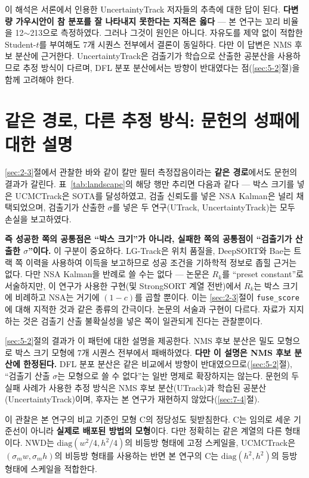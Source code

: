 \documentclass[12pt,a4paper,oneside]{report}
\begin{document}
이 해석은 서론에서 인용한 UncertaintyTrack 저자들의 추측에 대한 답이 된다. \textbf{다변량 가우시안이 참 분포를 잘 나타내지 못한다는 지적은 옳다} --- 본 연구는 꼬리 비율을 12$\sim$213으로 측정하였다. 그러나 그것이 원인은 아니다. 자유도를 제약 없이 적합한 Student-$t$를 부여해도 7개 시퀀스 전부에서 결론이 동일하다. 다만 이 답변은 NMS 후보 분산에 근거한다. UncertaintyTrack은 검출기가 학습으로 산출한 공분산을 사용하므로 추정 방식이 다르며, DFL 분포 분산에서는 방향이 반대였다는 점(\ref{sec:5-2}절)을 함께 고려해야 한다.

\section{같은 경로, 다른 추정 방식: 문헌의 성패에 대한 설명}\label{sec:6-2}

\ref{sec:2-3}절에서 관찰한 바와 같이 칼만 필터 측정잡음이라는 \textbf{같은 경로}에서도 문헌의 결과가 갈린다. 표~\ref{tab:landscape}의 해당 행만 추리면 다음과 같다 --- 박스 크기를 넣은 UCMCTrack\citep{yi2024}은 SOTA를 달성하였고, 검출 신뢰도를 넣은 NSA Kalman\citep{du2023}은 널리 채택되었으며, 검출기가 산출한 $\sigma$를 넣은 두 연구(UTrack\citep{solano2024}, UncertaintyTrack\citep{lee2024})는 모두 손실을 보고하였다.

\textbf{즉 성공한 쪽의 공통점은 ``박스 크기''가 아니라, 실패한 쪽의 공통점이 ``검출기가 산출한 $\sigma$''이다.} 이 구분이 중요하다. LG-Track은 위치 품질을, DeepSORT와 Bae는 트랙 쪽 이력을 사용하여 이득을 보고하므로 성공 조건을 기하학적 정보로 좁힐 근거는 없다. 다만 NSA Kalman을 반례로 쓸 수는 없다 --- 논문은 $R_k$를 ``preset constant''로 서술하지만, 이 연구가 사용한 구현(및 StrongSORT 계열 전반)에서 $R_k$는 박스 크기에 비례하고 NSA는 거기에 $(1-c)$를 곱할 뿐이다. 이는 \ref{sec:2-3}절이 \texttt{fuse\_score}에 대해 지적한 것과 같은 종류의 간극이다. 논문의 서술과 구현이 다르다. 자료가 지지하는 것은 검출기 산출 불확실성을 넣은 쪽이 일관되게 진다는 관찰뿐이다.

\ref{sec:5-2}절의 결과가 이 패턴에 대한 설명을 제공한다. NMS 후보 분산은 밀도 모형으로 박스 크기 모형에 7개 시퀀스 전부에서 패배하였다. \textbf{다만 이 설명은 NMS 후보 분산에 한정된다.} DFL 분포 분산은 같은 비교에서 방향이 반대였으므로(\ref{sec:5-2}절), ``검출기 산출 $\sigma$는 모형으로 쓸 수 없다''는 일반 명제로 확장하지는 않는다. 문헌의 두 실패 사례가 사용한 추정 방식은 NMS 후보 분산(UTrack)과 학습된 공분산(UncertaintyTrack)이며, 후자는 본 연구가 재현하지 않았다(\ref{sec:7-4}절).

이 관찰은 본 연구의 비교 기준인 모형 C의 정당성도 뒷받침한다. C는 임의로 세운 기준선이 아니라 \textbf{실제로 배포된 방법의 모형}이다. 다만 정확히는 같은 계열의 다른 형태이다. NWD는 $\mathrm{diag}(w^2/4, h^2/4)$의 비등방 형태에 고정 스케일을, UCMCTrack은 $(\sigma_m w, \sigma_m h)$의 비등방 형태를 사용하는 반면 본 연구의 C는 $\mathrm{diag}(h^2, h^2)$의 등방 형태에 스케일을 적합한다.
\end{document}
